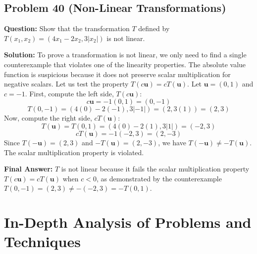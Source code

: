\documentclass[11pt]{article}
\begin{document}
\subsection{Problem 40 (Non-Linear Transformations)}
\textbf{Question:} Show that the transformation $T$ defined by $T(x_1, x_2) = (4x_1 - 2x_2, 3|x_2|)$ is not linear.

\textbf{Solution:}
To prove a transformation is not linear, we only need to find a single counterexample that violates one of the linearity properties. The absolute value function is suspicious because it does not preserve scalar multiplication for negative scalars. 
Let us test the property $T(c\mathbf{u}) = cT(\mathbf{u})$.
Let $\mathbf{u} = (0, 1)$ and $c = -1$.
First, compute the left side, $T(c\mathbf{u})$:
\[ c\mathbf{u} = -1(0, 1) = (0, -1) \]
\[ T(0, -1) = (4(0) - 2(-1), 3|-1|) = (2, 3(1)) = (2, 3) \]
Now, compute the right side, $cT(\mathbf{u})$:
\[ T(\mathbf{u}) = T(0, 1) = (4(0) - 2(1), 3|1|) = (-2, 3) \]
\[ cT(\mathbf{u}) = -1(-2, 3) = (2, -3) \]
Since $T(-\mathbf{u}) = (2, 3)$ and $-T(\mathbf{u}) = (2, -3)$, we have $T(-\mathbf{u}) \neq -T(\mathbf{u})$. The scalar multiplication property is violated.

\textbf{Final Answer:} $T$ is not linear because it fails the scalar multiplication property $T(c\mathbf{u}) = cT(\mathbf{u})$ when $c < 0$, as demonstrated by the counterexample $T(0, -1) = (2, 3) \neq -( -2, 3 ) = -T(0, 1)$.

\section{In-Depth Analysis of Problems and Techniques}
\end{document}

